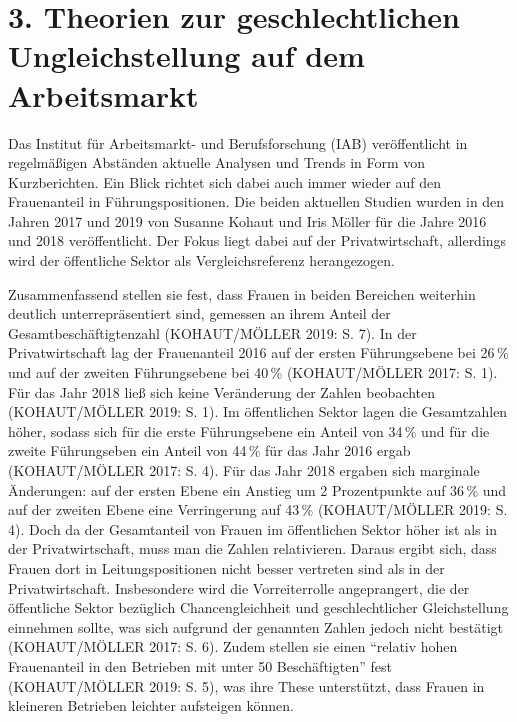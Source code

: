 \documentclass[a4paper,
fontsize=11pt,
oneside,
numbers=noperiodatend,
parskip=half-,
bibliography=totoc,
final
]{scrartcl}
\begin{document}
\hypertarget{theorien-zur-geschlechtlichen-ungleichstellung-auf-dem-arbeitsmarkt}{%
\section{3. Theorien zur geschlechtlichen Ungleichstellung auf dem
Arbeitsmarkt}\label{theorien-zur-geschlechtlichen-ungleichstellung-auf-dem-arbeitsmarkt}}

Das Institut für Arbeitsmarkt- und Berufsforschung (IAB) veröffentlicht
in regelmäßigen Abständen aktuelle Analysen und Trends in Form von
Kurzberichten. Ein Blick richtet sich dabei auch immer wieder auf den
Frauenanteil in Führungspositionen. Die beiden aktuellen Studien wurden
in den Jahren 2017 und 2019 von Susanne Kohaut und Iris Möller für die
Jahre 2016 und 2018 veröffentlicht. Der Fokus liegt dabei auf der
Privatwirtschaft, allerdings wird der öffentliche Sektor als
Vergleichsreferenz herangezogen.

Zusammenfassend stellen sie fest, dass Frauen in beiden Bereichen
weiterhin deutlich unterrepräsentiert sind, gemessen an ihrem Anteil der
Gesamtbeschäftigtenzahl (KOHAUT/MÖLLER 2019: S. 7). In der
Privatwirtschaft lag der Frauenanteil 2016 auf der ersten Führungsebene
bei 26\,\% und auf der zweiten Führungsebene bei 40\,\% (KOHAUT/MÖLLER 2017:
S. 1). Für das Jahr 2018 ließ sich keine Veränderung der Zahlen
beobachten (KOHAUT/MÖLLER 2019: S. 1). Im öffentlichen Sektor lagen die
Gesamtzahlen höher, sodass sich für die erste Führungsebene ein Anteil
von 34\,\% und für die zweite Führungseben ein Anteil von 44\,\% für das
Jahr 2016 ergab (KOHAUT/MÖLLER 2017: S. 4). Für das Jahr 2018 ergaben
sich marginale Änderungen: auf der ersten Ebene ein Anstieg um 2
Prozentpunkte auf 36\,\% und auf der zweiten Ebene eine Verringerung auf
43\,\% (KOHAUT/MÖLLER 2019: S. 4). Doch da der Gesamtanteil von Frauen im
öffentlichen Sektor höher ist als in der Privatwirtschaft, muss man die
Zahlen relativieren. Daraus ergibt sich, dass Frauen dort in
Leitungspositionen nicht besser vertreten sind als in der
Privatwirtschaft. Insbesondere wird die Vorreiterrolle angeprangert, die
der öffentliche Sektor bezüglich Chancengleichheit und geschlechtlicher
Gleichstellung einnehmen sollte, was sich aufgrund der genannten Zahlen
jedoch nicht bestätigt (KOHAUT/MÖLLER 2017: S. 6). Zudem stellen sie
einen \enquote{relativ hohen Frauenanteil in den Betrieben mit unter 50
Beschäftigten} fest (KOHAUT/MÖLLER 2019: S. 5), was ihre These
unterstützt, dass Frauen in kleineren Betrieben leichter aufsteigen
können.
\end{document}
